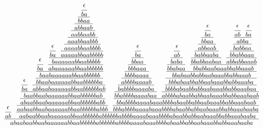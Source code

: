 \documentclass{article}
\begin{document}
 
$\cfrac{\cfrac{\epsilon}{ab} \ \ \cfrac{\cfrac{\cfrac{\cfrac{\cfrac{\epsilon}{ba} \ \ \cfrac{\cfrac{\cfrac{\cfrac{\epsilon}{ba} \ \ \cfrac{\cfrac{\cfrac{\epsilon}{ba} \ \ \cfrac{\cfrac{\cfrac{\cfrac{\cfrac{\cfrac{\cfrac{\epsilon}{ba}}{bbaa}}{abbaab}}{aabbaabb}}{aaabbaabbb}}{aaaabbaabbbb}}{aaaaabbaabbbbb}}{baaaaaabbaabbbbb}}{abaaaaaabbaabbbbbb}}{baabaaaaaabbaabbbbbb}}{bbaabaaaaaabbaabbbbbba}}{abbaabaaaaaabbaabbbbbbab}}{baabbaabaaaaaabbaabbbbbbab}}{abaabbaabaaaaaabbaabbbbbbabb}}{aabaabbaabaaaaaabbaabbbbbbabbb} \ \ \cfrac{\cfrac{\cfrac{\cfrac{\cfrac{\cfrac{\cfrac{\cfrac{\cfrac{\epsilon}{ba}}{bbaa}}{bbbaaa}}{bbbbaaaa}}{abbbbaaaab}}{babbbbaaaaba}}{bbabbbbaaaabaa} \ \ \cfrac{\cfrac{\cfrac{\cfrac{\cfrac{\cfrac{\cfrac{\epsilon}{ab}}{baba}}{bbabaa} \ \ \cfrac{\cfrac{\cfrac{\cfrac{\cfrac{\cfrac{\epsilon}{ba}}{bbaa}}{abbaab}}{babbaaba}}{bbabbaabaa} \ \ \cfrac{\cfrac{\cfrac{\cfrac{\cfrac{\epsilon}{ab} \ \ \cfrac{\epsilon}{ba}}{abba}}{babbaa}}{bbabbaaa}}{abbabbaaab}}{bbabbaabaaabbabbaaab}}{bbabaabbabbaabaaabbabbaaab}}{bbbabaabbabbaabaaabbabbaaaba}}{bbbbabaabbabbaabaaabbabbaaabaa}}{abbbbabaabbabbaabaaabbabbaaabaab}}{bbabbbbaaaabaaabbbbabaabbabbaabaaabbabbaaabaab}}{bbbabbbbaaaabaaabbbbabaabbabbaabaaabbabbaaabaaba}}{aabaabbaabaaaaaabbaabbbbbbabbbbbbabbbbaaaabaaabbbbabaabbabbaabaaabbabbaaabaaba}}{abaabaabbaabaaaaaabbaabbbbbbabbbbbbabbbbaaaabaaabbbbabaabbabbaabaaabbabbaaabaaba}$
 
\end{document}
